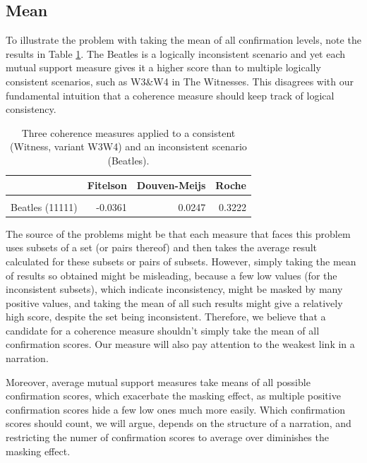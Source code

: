 \documentclass[10pt,]{scrartcl}
\begin{document}
\subsection{Mean}\label{sec:mean}


To illustrate the problem with taking the mean of all confirmation levels, note the results in Table \ref{tab:beatles}.  \textsf{The Beatles} is a logically inconsistent scenario and yet  each mutual support measure  gives it a higher score than to multiple  logically consistent scenarios, such as \textsf{W3}\&\textsf{W4} in  \textsf{The Witnesses}. This  disagrees with our fundamental
intuition that a coherence measure should keep track of logical
consistency. 



\begin{table}
\centering
\begin{tabular}{lrrr}
\toprule
  & Fitelson & Douven-Meijs & Roche\\
\midrule
\cellcolor{gray!6}{Witness W3W4 (11)} & \cellcolor{gray!6}{-0.2336} & \cellcolor{gray!6}{-0.1103} & \cellcolor{gray!6}{0.3147}\\
Beatles (11111) & -0.0361 & 0.0247 & 0.3222\\
\bottomrule
\end{tabular}
\caption{Three coherence measures applied to a consistent  (Witness, variant W3W4) and an inconsistent scenario (Beatles).}
\label{tab:beatles}
\end{table}

The source of the problems might be that each measure that faces this problem  uses subsets of a set (or pairs thereof) and then takes the average
result calculated for these subsets or pairs of subsets. However, simply
taking the mean of results so obtained might be misleading, because a
few low values (for the inconsistent subsets), which indicate
inconsistency, might be masked by many positive values, and taking the mean of all such results might give a
relatively high score, despite the set being inconsistent. Therefore, we
believe that a candidate for a coherence measure shouldn't simply take the
mean of all  confirmation scores. Our measure will also pay attention to the weakest link in a narration. 

Moreover,  average mutual support measures take means of all possible confirmation scores, which exacerbate the masking effect, as multiple positive confirmation scores hide a few low ones much more easily. Which confirmation scores should count, we will argue, depends on the structure of a narration, and restricting the numer of confirmation scores to average over diminishes the masking effect.
\end{document}

